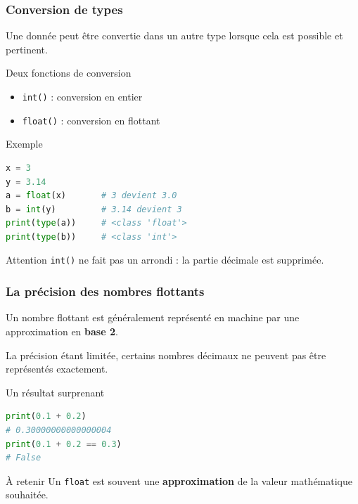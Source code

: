 \documentclass[10pt]{beamer}
\begin{document}
\begin{frame}[containsverbatim]
\frametitle{Conversion de types}

Une donnée peut être convertie dans un autre type lorsque cela
est possible et pertinent.

\begin{block}{Deux fonctions de conversion}
\begin{itemize}
\item \texttt{int()} : conversion en entier
\item \texttt{float()} : conversion en flottant
\end{itemize}
\end{block}

\vspace{0.2cm}

\begin{exampleblock}{Exemple}
\begin{lstlisting}[language=Python]
x = 3
y = 3.14
a = float(x)       # 3 devient 3.0
b = int(y)         # 3.14 devient 3
print(type(a))     # <class 'float'>
print(type(b))     # <class 'int'>
\end{lstlisting}
\end{exampleblock}

\begin{alertblock}{Attention}
\texttt{int()} ne fait pas un arrondi : la partie décimale est supprimée.
\end{alertblock}
\end{frame}

\begin{frame}[containsverbatim]
\frametitle{La précision des nombres flottants}

Un nombre flottant est généralement représenté en machine
par une approximation en \textbf{base 2}.\newline


La précision étant limitée, certains nombres décimaux
ne peuvent pas être représentés exactement.

\vspace{0.2cm}

\begin{exampleblock}{Un résultat surprenant}
\begin{lstlisting}[language=Python]
print(0.1 + 0.2)
# 0.30000000000000004
print(0.1 + 0.2 == 0.3)
# False
\end{lstlisting}
\end{exampleblock}

\vspace{0.15cm}

\begin{alertblock}{À retenir}
Un \texttt{float} est souvent une \textbf{approximation} de la valeur
mathématique souhaitée.
\end{alertblock}

\end{frame}
\end{document}
